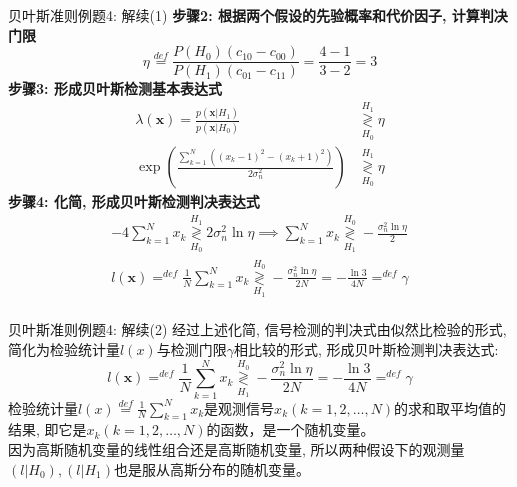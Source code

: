 \begin{frame}[shrink]{贝叶斯准则例题4: 解续(1)}
\textbf{步骤2: 根据两个假设的先验概率和代价因子, 计算判决门限}
\[\eta\mathop{=}\limits^{def}\frac{P(H_0)(c_{10}-c_{00})}{P(H_1)(c_{01}-c_{11})}=\frac{4-1}{3-2}=3 \]
\textbf{步骤3: 形成贝叶斯检测基本表达式}
\begin{align*}
\lambda(\bm{x})=\frac{p(\bm{x}|H_1)}{p(\bm{x}|H_0)}&\mathop{\gtrless}\limits_{H_0}^{H_1}\eta\\
\exp\left(\frac{\sum\limits_{k=1}^{N}\left((x_k-1)^2-(x_k+1)^2\right)}{2\sigma_n^2}\right)&\mathop{\gtrless}\limits_{H_0}^{H_1}\eta
\end{align*} 
\textbf{步骤4: 化简, 形成贝叶斯检测判决表达式}
\begin{align*}
-4\sum\limits_{k=1}^{N}x_k\mathop{\gtrless}\limits_{H_0}^{H_1}2\sigma_n^2\ln\eta\implies \sum\limits_{k=1}^{N}x_k\mathop{\gtrless}\limits_{H_1}^{H_0}-\frac{\sigma_n^2\ln\eta}{2}\\
l(\bm{x})\mathop{=}^{def}\frac{1}{N}\sum\limits_{k=1}^{N}x_k\mathop{\gtrless}\limits_{H_1}^{H_0}-\frac{\sigma_n^2\ln\eta}{2N}=-\frac{\ln3}{4N}\mathop{=}^{def}\gamma\\
\end{align*} 
\end{frame}

\begin{frame}[shrink]{贝叶斯准则例题4: 解续(2)}
经过上述化简, 信号检测的判决式由似然比检验的形式, 简化为检验统计量$l(x)$与检测门限$\gamma$相比较的形式, 形成贝叶斯检测判决表达式:
\[
l(\bm{x})\mathop{=}^{def}\frac{1}{N}\sum\limits_{k=1}^{N}x_k\mathop{\gtrless}\limits_{H_1}^{H_0}-\frac{\sigma_n^2\ln\eta}{2N}=-\frac{\ln3}{4N}\mathop{=}^{def}\gamma
\]
检验统计量$l(x)\mathop{=}\limits^{def}\frac{1}{N}\sum\limits_{k=1}^Nx_k$是观测信号$x_k(k=1,2,\dots,N)$的求和取平均值的结果, 即它是$x_k(k=1,2,\dots,N)$的函数，是一个随机变量。\\
因为高斯随机变量的线性组合还是高斯随机变量,  所以两种假设下的观测量$(l|H_0),(l|H_1)$也是服从高斯分布的随机变量。
\end{frame}

